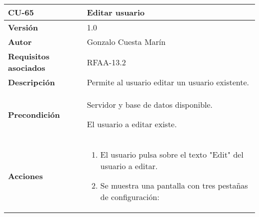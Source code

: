 \begin{longtable}[]{@{}ll@{}}
\toprule
\begin{minipage}[b]{0.21\columnwidth}\raggedright
\textbf{CU-65}\strut
\end{minipage} & \begin{minipage}[b]{0.73\columnwidth}\raggedright
\textbf{Editar usuario}\strut
\end{minipage}\tabularnewline
\midrule
\endhead
\begin{minipage}[t]{0.21\columnwidth}\raggedright
\textbf{Versión}\strut
\end{minipage} & \begin{minipage}[t]{0.73\columnwidth}\raggedright
1.0\strut
\end{minipage}\tabularnewline
\begin{minipage}[t]{0.21\columnwidth}\raggedright
\textbf{Autor}\strut
\end{minipage} & \begin{minipage}[t]{0.73\columnwidth}\raggedright
Gonzalo Cuesta Marín\strut
\end{minipage}\tabularnewline
\begin{minipage}[t]{0.21\columnwidth}\raggedright
\textbf{Requisitos asociados}\strut
\end{minipage} & \begin{minipage}[t]{0.73\columnwidth}\raggedright
RFAA-13.2\strut
\end{minipage}\tabularnewline
\begin{minipage}[t]{0.21\columnwidth}\raggedright
\textbf{Descripción}\strut
\end{minipage} & \begin{minipage}[t]{0.73\columnwidth}\raggedright
Permite al usuario editar un usuario existente.\strut
\end{minipage}\tabularnewline
\begin{minipage}[t]{0.21\columnwidth}\raggedright
\textbf{Precondición}\strut
\end{minipage} & \begin{minipage}[t]{0.73\columnwidth}\raggedright
Servidor y base de datos disponible.

El usuario a editar existe.\strut
\end{minipage}\tabularnewline
\begin{minipage}[t]{0.21\columnwidth}\raggedright
\textbf{Acciones}\strut
\end{minipage} & \begin{minipage}[t]{0.73\columnwidth}\raggedright
\begin{enumerate}
\def\labelenumi{\arabic{enumi}.}
\tightlist
\item
  El usuario pulsa sobre el texto "Edit" del usuario a editar.
\item
  Se muestra una pantalla con tres pestañas de configuración:


\end{enumerate}
\end{minipage}
\end{longtable}
